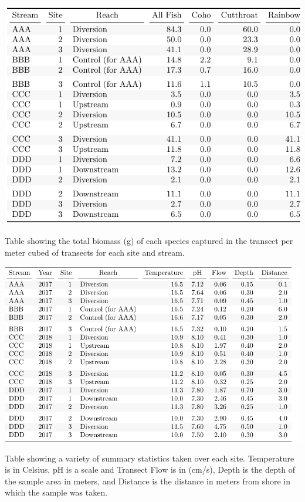 \begin{table}[H]
\includegraphics{Chapter5Images/kable_gm3.pdf}
\caption{  \hspace{1mm} Table showing the total biomass (g) of each species captured in the transect per meter cubed of transects for each site and stream.}
\label{fig:kablemass3}
\end{table}





\begin{table}[H]
\includegraphics{Chapter5Images/test_update.pdf}
\caption{  \hspace{1mm}  Table showing a variety of summary statistics taken over each site. Temperature is in Celsius, pH is a scale and Transect Flow is in (cm/s), Depth is the depth of the sample area in meters, and Distance is the distance in meters from shore in which the sample was taken.}
\label{fig:kabletemp}
\end{table}

